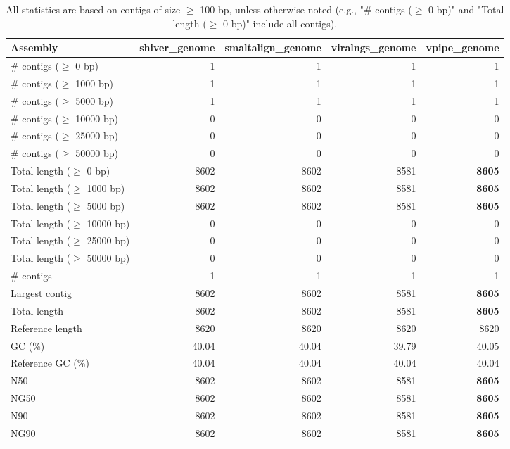 \documentclass[12pt,a4paper]{article}
\begin{document}
\begin{table}[ht]
\begin{center}
\caption{All statistics are based on contigs of size $\geq$ 100 bp, unless otherwise noted (e.g., "\# contigs ($\geq$ 0 bp)" and "Total length ($\geq$ 0 bp)" include all contigs).}
\begin{tabular}{|l*{4}{|r}|}
\hline
Assembly & shiver\_genome & smaltalign\_genome & viralngs\_genome & vpipe\_genome \\ \hline
\# contigs ($\geq$ 0 bp) & 1 & 1 & 1 & 1 \\ \hline
\# contigs ($\geq$ 1000 bp) & 1 & 1 & 1 & 1 \\ \hline
\# contigs ($\geq$ 5000 bp) & 1 & 1 & 1 & 1 \\ \hline
\# contigs ($\geq$ 10000 bp) & 0 & 0 & 0 & 0 \\ \hline
\# contigs ($\geq$ 25000 bp) & 0 & 0 & 0 & 0 \\ \hline
\# contigs ($\geq$ 50000 bp) & 0 & 0 & 0 & 0 \\ \hline
Total length ($\geq$ 0 bp) & 8602 & 8602 & 8581 & {\bf 8605} \\ \hline
Total length ($\geq$ 1000 bp) & 8602 & 8602 & 8581 & {\bf 8605} \\ \hline
Total length ($\geq$ 5000 bp) & 8602 & 8602 & 8581 & {\bf 8605} \\ \hline
Total length ($\geq$ 10000 bp) & 0 & 0 & 0 & 0 \\ \hline
Total length ($\geq$ 25000 bp) & 0 & 0 & 0 & 0 \\ \hline
Total length ($\geq$ 50000 bp) & 0 & 0 & 0 & 0 \\ \hline
\# contigs & 1 & 1 & 1 & 1 \\ \hline
Largest contig & 8602 & 8602 & 8581 & {\bf 8605} \\ \hline
Total length & 8602 & 8602 & 8581 & {\bf 8605} \\ \hline
Reference length & 8620 & 8620 & 8620 & 8620 \\ \hline
GC (\%) & 40.04 & 40.04 & 39.79 & 40.05 \\ \hline
Reference GC (\%) & 40.04 & 40.04 & 40.04 & 40.04 \\ \hline
N50 & 8602 & 8602 & 8581 & {\bf 8605} \\ \hline
NG50 & 8602 & 8602 & 8581 & {\bf 8605} \\ \hline
N90 & 8602 & 8602 & 8581 & {\bf 8605} \\ \hline
NG90 & 8602 & 8602 & 8581 & {\bf 8605} \\ \hline

\end{tabular}
\end{center}
\end{table}
\end{document}
